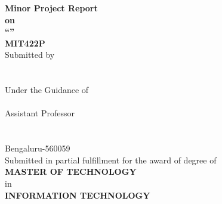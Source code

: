 
    \begin{titlepage}
        \begin{center}
        \vspace*{1cm}
    
        {\large\bfseries Minor Project Report}\\[4pt]
        {\large\bfseries on}\\[8pt]
        {\Large\bfseries ``\ProjectTitle''}\\[20pt]
    
        {\large\bfseries MIT422P}\\[24pt]
    
        Submitted by\\[6pt]
        {\large\bfseries \StudentName}\\
        \USN\\[24pt]
    
        Under the Guidance of\\[6pt]
        {\large\bfseries \GuideName}\\
        Assistant Professor\\
        \Dept\\
        \College\\
        Bengaluru-560059\\[24pt]
    
        Submitted in partial fulfillment for the award of degree of\\[6pt]
        {\large\bfseries MASTER OF TECHNOLOGY}\\
        in\\
        {\large\bfseries INFORMATION TECHNOLOGY}\\[12pt]
    
        \MakeUppercase{\Dept}\\
        \MakeUppercase{\College}\\[6pt]
        \AcademicYear
    
        \end{center}
        \end{titlepage}
    
